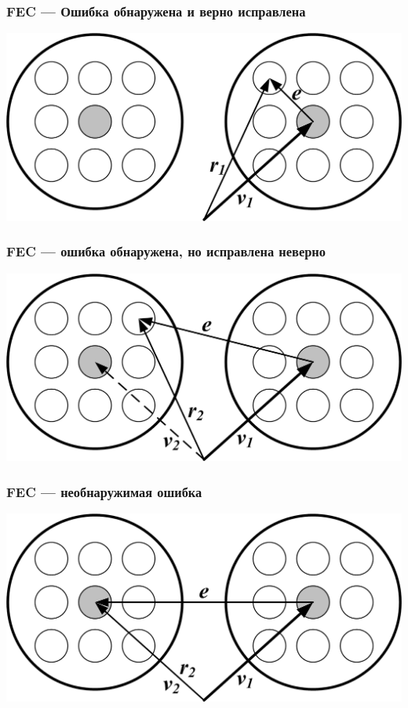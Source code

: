 \begin{frame}
    \frametitle{FEC --- Ошибка обнаружена и верно исправлена}
    
    \begin{center}
        \includegraphics[width=.8\textwidth]{fig/fecOk} 
    \end{center}
\end{frame}


\begin{frame}
    \frametitle{FEC --- ошибка обнаружена, но исправлена неверно}
    
    \begin{center}
        \includegraphics[width=.8\textwidth]{fig/fecIncorrect} 
    \end{center}
\end{frame}


\begin{frame}
    \frametitle{FEC --- необнаружимая ошибка}
    
    \begin{center}
        \includegraphics[width=.8\textwidth]{fig/fecFail} 
    \end{center}
\end{frame}

